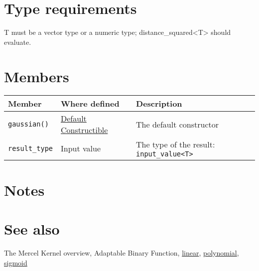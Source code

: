 \documentclass{article}
\begin{document}
\section*{Type requirements}

T must be a vector type or a numeric type; distance_squared<T> should evaluate.


\section*{Members}

\begin{tabular}{lll}
\textbf{Member} & \textbf{Where defined} & \textbf{Description} \\ 
\hline
\texttt{gaussian()} & \href{http://www.sgi.com/tech/stl/DefaultConstructible.html}{Default Constructible} & The default constructor \\
\texttt{result_type} & Input value & The type of the result: \texttt{input_value<T>} \\
\end{tabular}

\section*{Notes}

\section*{See also}

The Mercel Kernel overview, Adaptable Binary Function, 
\href{\kmlroot/linear.html}{linear}, 
\href{\kmlroot/polynomial.html}{polynomial}, 
\href{\kmlroot/sigmoid.html}{sigmoid}



\end{document}

